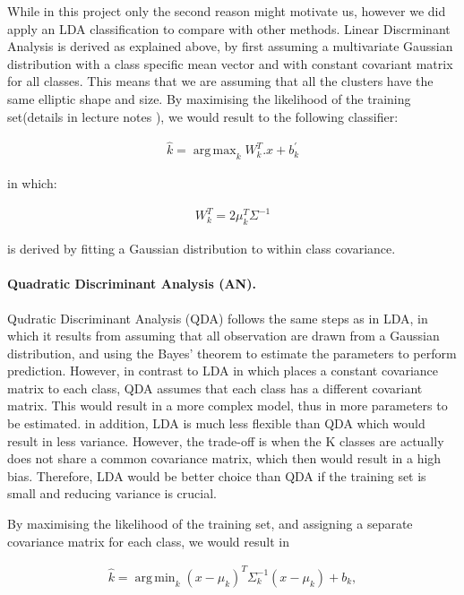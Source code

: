 \documentclass[12pt, a4paper]{scrartcl}
\DeclareMathOperator*{\argmin}{arg\,min}
\DeclareMathOperator*{\argmax}{arg\,max}
\begin{document}
While in this project only the second reason might motivate us, however we did apply an LDA classification to compare with other methods. Linear Discrminant Analysis is derived as explained above, by first assuming a multivariate Gaussian distribution with a class specific mean vector and with constant covariant matrix for all classes. This means that we are assuming that all the clusters have the same elliptic shape and size. By maximising the likelihood of the training set(details in lecture notes \citep{kothe2018foml}), we would result to the following classifier:

\begin{align}
	\hat{k} = \argmax_{k}W^{T}_{k} . x + b^\prime_{k}
\end{align}

in which:

\begin{align}
	W^{T}_{k} = 2 \mu^{T}_{k}\Sigma^{-1}
\end{align}

is derived by fitting a Gaussian distribution to within class covariance.

\paragraph{Quadratic Discriminant Analysis  (AN).} Qudratic Discriminant Analysis (QDA) follows the same steps as in LDA, in which it results from assuming that all observation are drawn from a Gaussian distribution, and using the Bayes' theorem to estimate the parameters to perform prediction. However, in contrast to LDA in which places a constant covariance matrix to each class, QDA assumes that each class has a different covariant matrix. This would result in a more complex model, thus in more parameters to be estimated. in addition, LDA is much less flexible than QDA which would result in less variance. However, the trade-off is when the K classes are actually does not share a common covariance matrix, which then would result in a high bias. Therefore, LDA would be better choice than QDA if the training set is small and reducing variance is crucial. 

By maximising the likelihood of the training set, and assigning a separate covariance matrix for each class, we would result in

\begin{align}
	\hat{k} = \argmin_{k}(x - \mu_{k})^{T}\Sigma^{-1}_{k}(x - \mu_{k}) + b_{k},
\end{align}
\end{document}
